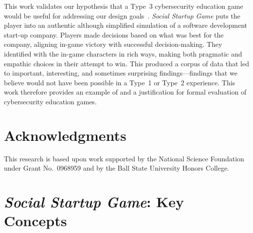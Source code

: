 \documentclass[letterpaper]{article}
\begin{document}
This work validates our hypothesis that a Type~3 cybersecurity
education game would be useful for addressing our design
goals~\citep{Gestwicki2015}. 
\textit{Social Startup Game} puts the player into an authentic 
although simplified simulation of a software development start-up company.
Players made decisions based on what was best for the company, 
aligning in-game victory with successful decision-making.
They identified with the in-game characters in rich ways, making
both pragmatic and empathic choices in their attempt to win.
This produced a corpus of data that led to important, interesting, and
sometimes surprising findings---findings that we believe would not have
been possible in a Type~1 or Type~2 experience.
This work therefore provides an example of and a justification for
formal evaluation of cybersecurity education games. 


\section{Acknowledgments}

This research is based upon work supported by the National Science
Foundation under Grant No.~0968959 and by the Ball State University
Honors College.





\clearpage
\appendix

\clearpage
\section{\textit{Social Startup Game}: Key Concepts}
\label{appendix:key-concepts}
\end{document}

